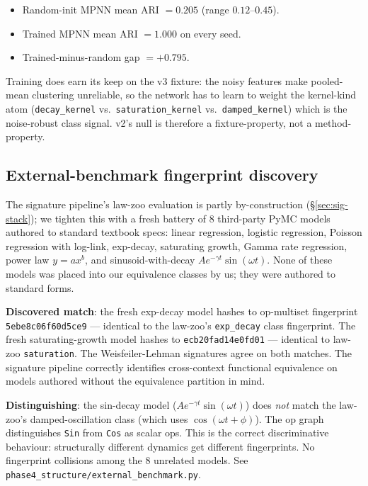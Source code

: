 \documentclass{article}
\begin{document}
\begin{itemize}[leftmargin=*, itemsep=0pt]
\item Random-init MPNN mean ARI $= \mathbf{0.205}$
  (range $0.12$--$0.45$).
\item Trained MPNN mean ARI $= \mathbf{1.000}$ on every seed.
\item Trained-minus-random gap $= +0.795$.
\end{itemize}
Training does earn its keep on the v3 fixture: the noisy features
make pooled-mean clustering unreliable, so the network has to learn
to weight the kernel-kind atom (\texttt{decay\_kernel} vs.\
\texttt{saturation\_kernel} vs.\ \texttt{damped\_kernel}) which is
the noise-robust class signal. v2's null is therefore a
fixture-property, not a method-property.

\subsection{External-benchmark fingerprint discovery}
\label{sec:external}

The signature pipeline's law-zoo evaluation is partly by-construction
(\S\ref{sec:sig-stack}); we tighten this with a fresh battery of
$8$ third-party PyMC models authored to standard textbook specs:
linear regression, logistic regression, Poisson regression with
log-link, exp-decay, saturating growth, Gamma rate regression,
power law $y = a x^{b}$, and sinusoid-with-decay
$A e^{-\gamma t} \sin(\omega t)$. None of these models was placed
into our equivalence classes by us; they were authored to standard
forms.

\textbf{Discovered match}: the fresh exp-decay model hashes to
op-multiset fingerprint \texttt{5ebe8c06f60d5ce9} --- identical to
the law-zoo's \texttt{exp\_decay} class fingerprint. The fresh
saturating-growth model hashes to \texttt{ecb20fad14e0fd01} ---
identical to law-zoo \texttt{saturation}. The Weisfeiler-Lehman
signatures agree on both matches. The signature pipeline correctly
identifies cross-context functional equivalence on models authored
without the equivalence partition in mind.

\textbf{Distinguishing}: the sin-decay model
($A e^{-\gamma t} \sin(\omega t)$) does \emph{not} match the
law-zoo's damped-oscillation class (which uses
$\cos(\omega t + \phi)$). The op graph distinguishes \texttt{Sin}
from \texttt{Cos} as scalar ops. This is the correct discriminative
behaviour: structurally different dynamics get different
fingerprints. No fingerprint collisions among the $8$ unrelated
models. See \texttt{phase4\_structure/external\_benchmark.py}.
\end{document}
